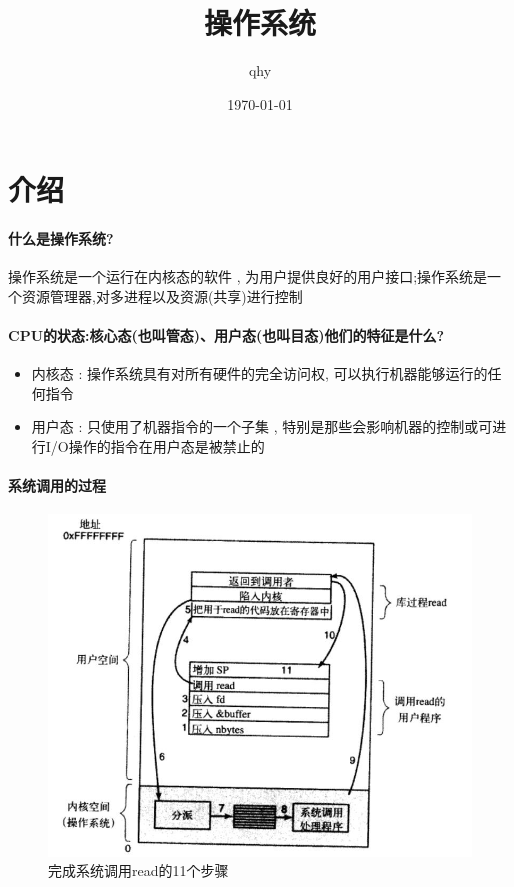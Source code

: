\documentclass[UTF8,a4paper]{ctexart}
\author{ qhy }
\date{\today}
\title{操作系统}
\begin{document}
\maketitle
\tableofcontents
\newpage

\section{介绍}

\paragraph{什么是操作系统?}操作系统是一个运行在内核态的软件 , 为用户提供良好的用户接口;操作系统是一个资源管理器,对多进程以及资源(共享)进行控制

\paragraph{CPU的状态:核心态(也叫管态)、用户态(也叫目态)他们的特征是什么?}
\begin{itemize}
	\item 内核态 : 操作系统具有对所有硬件的完全访问权, 可以执行机器能够运行的任何指令
	\item 用户态 : 只使用了机器指令的一个子集 , 特别是那些会影响机器的控制或可进行I/O操作的指令在用户态是被禁止的
\end{itemize}

\paragraph{系统调用的过程}
\begin{figure}[H]
	\centering
	\includegraphics[scale = 0.3]{assets/ModernOperatingSystems/2018-01-11-19-44-54.png}
	\caption{完成系统调用read的11个步骤}
\end{figure}
\end{document}
